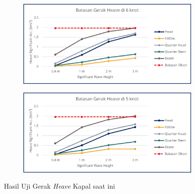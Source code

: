 \begin{figure}[!ht]
    \centering
    \begin{subfigure}{0.48\textwidth}
        \centering
        \includegraphics[width=\textwidth]{grafik/uji-heave-spob.jpg}
    \end{subfigure}
    \hfill  %
    \begin{subfigure}{0.48\textwidth}
        \centering
        \includegraphics[width=\textwidth]{grafik/uji-heave-spob2.jpg}
    \end{subfigure}
    \caption{Hasil Uji Gerak \emph{Heave} Kapal saat ini}
    \label{fig:uji-heave-spob}
\end{figure}

